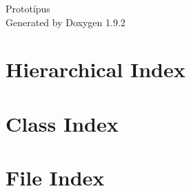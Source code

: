 \documentclass[twoside]{book}
\newcommand{\+}{\discretionary{\mbox{\scriptsize$\hookleftarrow$}}{}{}}
\newcommand{\clearemptydoublepage}{%
    \newpage{\pagestyle{empty}\cleardoublepage}%
  }
\begin{document}
  \raggedbottom
    \hypersetup{pageanchor=false,
                bookmarksnumbered=true,
                pdfencoding=unicode
               }
  \begin{titlepage}
  \vspace*{7cm}
  \begin{center}%
  {\Large Prototípus}\\
  \vspace*{1cm}
  {\large Generated by Doxygen 1.9.2}\\
  \end{center}
  \end{titlepage}
  \clearemptydoublepage
  \tableofcontents
  \clearemptydoublepage
  \hypersetup{pageanchor=true}
\chapter{Hierarchical Index}

\chapter{Class Index}

\chapter{File Index}

\end{document}
